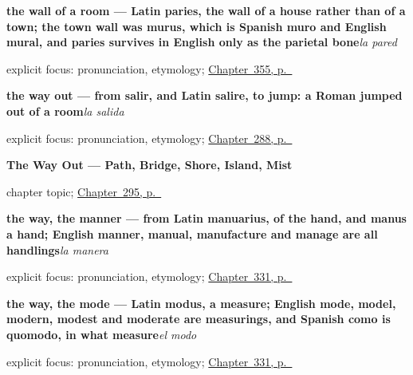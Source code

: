 \noindent\begin{minipage}[t]{\linewidth}
\raggedright
\textbf{the wall of a room — Latin paries, the wall of a house rather than of a town; the town wall was murus, which is Spanish muro and English mural, and paries survives in English only as the parietal bone}\enspace\emph{la pared}\par
\footnotesize explicit focus: pronunciation, etymology; \hyperref[ch:la-pared-y-el-techo]{Chapter~355, p.~\pageref*{ch:la-pared-y-el-techo}}
\end{minipage}\par\smallskip

\noindent\begin{minipage}[t]{\linewidth}
\raggedright
\textbf{the way out — from salir, and Latin salire, to jump: a Roman jumped out of a room}\enspace\emph{la salida}\par
\footnotesize explicit focus: pronunciation, etymology; \hyperref[ch:la-partida]{Chapter~288, p.~\pageref*{ch:la-partida}}
\end{minipage}\par\smallskip

\noindent\begin{minipage}[t]{\linewidth}
\raggedright
\textbf{The Way Out --- Path, Bridge, Shore, Island, Mist}\par
\footnotesize chapter topic; \hyperref[ch:el-sendero]{Chapter~295, p.~\pageref*{ch:el-sendero}}
\end{minipage}\par\smallskip

\noindent\begin{minipage}[t]{\linewidth}
\raggedright
\textbf{the way, the manner — from Latin manuarius, of the hand, and manus a hand; English manner, manual, manufacture and manage are all handlings}\enspace\emph{la manera}\par
\footnotesize explicit focus: pronunciation, etymology; \hyperref[ch:manera-y-asunto]{Chapter~331, p.~\pageref*{ch:manera-y-asunto}}
\end{minipage}\par\smallskip

\noindent\begin{minipage}[t]{\linewidth}
\raggedright
\textbf{the way, the mode — Latin modus, a measure; English mode, model, modern, modest and moderate are measurings, and Spanish como is quomodo, in what measure}\enspace\emph{el modo}\par
\footnotesize explicit focus: pronunciation, etymology; \hyperref[ch:manera-y-asunto]{Chapter~331, p.~\pageref*{ch:manera-y-asunto}}
\end{minipage}\par\smallskip

